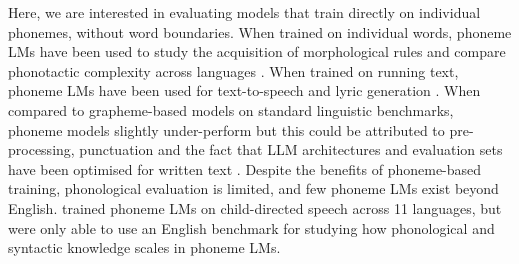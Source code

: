 


Here, we are interested in evaluating models that train directly on individual phonemes, without word boundaries. When trained on individual words, phoneme LMs have been used to study the acquisition of morphological rules \citep{kirov-2018-recurrent} and compare phonotactic complexity across languages \citep{pimentel2020phonotactic}. When trained on running text, phoneme LMs have been used for text-to-speech \citep{li-2023-phoneme-level-bert} and lyric generation \citep{ding-2024-songcomposer}. When compared to grapheme-based models on standard linguistic benchmarks, phoneme models slightly under-perform \citep{nguyen-2022-word-boundaries, bunzeck2024graphemes} but this could be attributed to pre-processing, punctuation and the fact that LLM architectures and evaluation sets have been optimised for written text \citep{goriely2024babble}. Despite the benefits of phoneme-based training, phonological evaluation is limited, and few phoneme LMs exist beyond English. \citet{goriely2025} trained phoneme LMs on child-directed speech across 11 languages, but were only able to use an English benchmark for studying how phonological and syntactic knowledge scales in phoneme LMs. 


